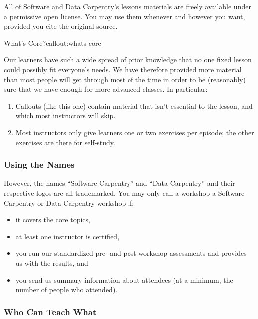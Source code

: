 All of Software and Data Carpentry's lessons materials are freely
available under a permissive open license. You may use
them whenever and however you want, provided you cite the original
source.

\begin{callout}{What's Core?}{callout:whats-core}

Our learners have such a wide spread of prior knowledge that no one
fixed lesson could possibly fit everyone's needs. We have therefore
provided more material than most people will get through most of the
time in order to be (reasonably) sure that we have enough for more
advanced classes. In particular:

\begin{enumerate}
\item
  Callouts (like this one) contain material that isn't essential to the
  lesson, and which most instructors will skip.
\item
  Most instructors only give learners one or two exercises per episode;
  the other exercises are there for self-study.
\end{enumerate}
\end{callout}

\subsubsection{Using the Names}\label{using-the-names}

However, the names ``Software Carpentry'' and ``Data Carpentry'' and
their respective logos are all trademarked. You may only call a workshop
a Software Carpentry or Data Carpentry workshop if:

\begin{itemize}
\item
  it covers the core topics,
\item
  at least one instructor is certified,
\item
  you run our standardized pre- and post-workshop assessments and
  provides us with the results, and
\item
  you send us summary information about attendees (at a minimum, the
  number of people who attended).
\end{itemize}

\subsubsection{Who Can Teach What}\label{who-can-teach-what}

